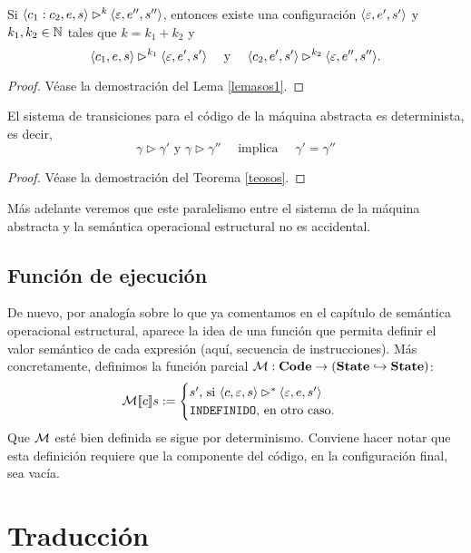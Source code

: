 \begin{lema}\label{lemaam2}
Si $\langle c_1:c_2, e, s \rangle \rhd^k \langle \varepsilon, e'', s'' \rangle$, entonces existe una configuración $\langle \varepsilon, e', s' \rangle$ y $k_1, k_2 \in \mathbb{N}$ tales que $k = k_1 + k_2$ y 
$$\langle c_1, e, s \rangle \rhd^{k_1} \langle \varepsilon, e', s' \rangle \quad\text{ y }\quad \langle c_2, e', s' \rangle \rhd^{k_2} \langle \varepsilon, e'', s'' \rangle.$$
\end{lema}
\begin{proof}
Véase la demostración del Lema \ref{lemasos1}.
\end{proof}

\begin{theorem}
El sistema de transiciones para el código de la máquina abstracta es determinista, es decir, 
$$\gamma \rhd \gamma'  \text{ y }\gamma \rhd \gamma'' \quad \text{ implica } \quad \gamma' = \gamma''$$
\end{theorem}
\begin{proof}
Véase la demostración del Teorema \ref{teosos}.
\end{proof}

Más adelante veremos que este paralelismo entre el sistema de la máquina abstracta y la semántica operacional estructural no es accidental.

\subsection{Función de ejecución}

De nuevo, por analogía sobre lo que ya comentamos en el capítulo de semántica operacional estructural, aparece la idea de una función que  permita definir el valor semántico de cada expresión (aquí, secuencia de instrucciones). Más concretamente, definimos la función parcial $\mathcal{M}: \mathbf{Code} \rightarrow (\mathbf{State} \hookrightarrow \mathbf{State})$:
$$\mathcal{M}[\![c]\!]s := \begin{cases}s' \text{, si } \langle c, \varepsilon, s \rangle\rhd^* \langle \varepsilon, e, s' \rangle\\ \texttt{INDEFINIDO} \text{, en otro caso.}\end{cases}$$
Que $\mathcal{M}$ esté bien definida se sigue por determinismo. Conviene hacer notar que esta definición requiere que la componente del código, en la configuración final, sea vacía.

\section{Traducción}

